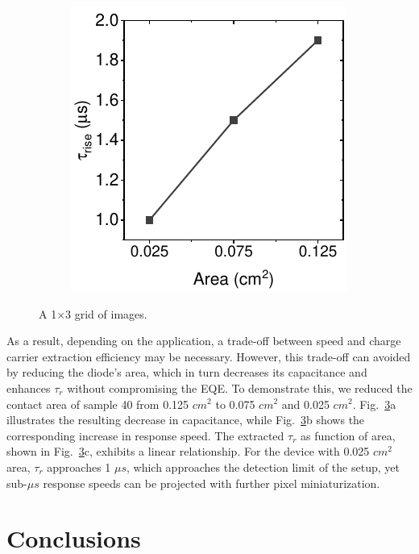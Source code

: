 \begin{figure}[htbp]
\begin{subfigure}{0.3\textwidth}
        \caption{}
        \label{}
    \end{subfigure}
    \hfill
    \begin{subfigure}{0.29\textwidth}
        \centering
        \includegraphics[width=\textwidth]{chapters/transport_layers/images/Rise_time_farea.pdf}
        \caption{}
        \label{}
    \end{subfigure}
    
    \caption{A 1×3 grid of images.}
    \label{fig:etl_opt:dev_area}
\end{figure}

As a result, depending on the application, a trade-off between speed and charge carrier extraction efficiency may be necessary. However, this trade-off can avoided by reducing the diode's area, which in turn decreases its capacitance and enhances $\tau_r$ without compromising the EQE. To demonstrate this, we reduced the contact area of sample 40 from 0.125 $cm^2$ to 0.075 $cm^2$ and 0.025 $cm^2$. Fig.~\ref{fig:etl_opt:dev_area}a illustrates the resulting decrease in capacitance, while Fig.~\ref{fig:etl_opt:dev_area}b shows the corresponding increase in response speed. The extracted $\tau_r$ as function of area, shown in Fig.~\ref{fig:etl_opt:dev_area}c, exhibits a linear relationship. For the device with 0.025 $cm^2$ area, $\tau_r$ approaches 1 $\mu s$, which approaches the detection limit of the setup, yet sub-$\mu s$ response speeds can be projected with further pixel miniaturization. 



\section{Conclusions}



\cleardoublepage

